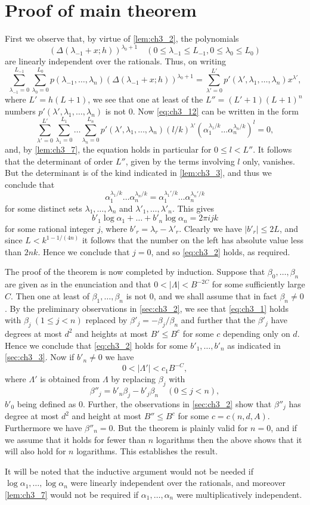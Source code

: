\section{Proof of main theorem}

First we observe that, by virtue of \autoref{lem:ch3_2}, the polynomials
\[
(\Delta(\lambda_{-1}+x; h))^{\lambda_0+1} \quad (0 \le \lambda_{-1} \le L_{-1}, 0 \le \lambda_0 \le L_0)
\]
are linearly independent over the rationals. Thus, on writing
\[
\sum_{\lambda_{-1}=0}^{L_{-1}} \sum_{\lambda_0=0}^{L_0} p(\lambda_{-1}, \dots, \lambda_n) (\Delta(\lambda_{-1}+x; h))^{\lambda_0+1} = \sum_{\lambda'=0}^{L'} p'(\lambda', \lambda_1, \dots, \lambda_n) x^{\lambda'},
\]
where $L' = h(L+1)$, we see that one at least of the $L'' = (L'+1)(L+1)^n$ numbers $p'(\lambda', \lambda_1, \dots, \lambda_n)$ is not $0$. Now \eqref{eq:ch3_12} can be written in the form
\[
\sum_{\lambda'=0}^{L'} \sum_{\lambda_1=0}^{L_1} \dots \sum_{\lambda_n=0}^{L_n} p'(\lambda', \lambda_1, \dots, \lambda_n) (l/k)^{\lambda'} (\alpha_1^{\lambda_1/k} \dots \alpha_n^{\lambda_n/k})^l = 0,
\]
and, by \autoref{lem:ch3_7}, the equation holds in particular for $0 \le l < L''$. It follows that the determinant of order $L''$, given by the terms involving $l$ only, vanishes. But the determinant is of the kind indicated in \autoref{lem:ch3_3}, and thus we conclude that
\[
\alpha_1^{\lambda_1/k} \dots \alpha_n^{\lambda_n/k} = \alpha_1^{\lambda_1'/k} \dots \alpha_n^{\lambda_n'/k}
\]
for some distinct sets $\lambda_1, \dots, \lambda_n$ and $\lambda'_1, \dots, \lambda'_n$. This gives
\[
b'_1 \log \alpha_1 + \dots + b'_n \log \alpha_n = 2\pi ijk
\]
for some rational integer $j$, where $b'_r = \lambda_r - \lambda'_r$. Clearly we have $|b'_r| \le 2L$, and since $L < k^{1-1/(4n)}$ it follows that the number on the left has absolute value less than $2nk$. Hence we conclude that $j = 0$, and so \eqref{eq:ch3_2} holds, as required.

The proof of the theorem is now completed by induction. Suppose that $\beta_0, \dots, \beta_n$ are given as in the enunciation and that $0 < |\Lambda| < B^{-2C}$ for some sufficiently large $C$. Then one at least of $\beta_1, \dots, \beta_n$ is not $0$, and we shall assume that in fact $\beta_n \neq 0$. By the preliminary observations in \autoref{sec:ch3_2}, we see that \eqref{eq:ch3_1} holds with $\beta_j \ (1 \le j < n)$ replaced by $\beta'_j = -\beta_j/\beta_n$ and further that the $\beta'_j$ have degrees at most $d^2$ and heights at most $B' \le B^c$ for some $c$ depending only on $d$. Hence we conclude that \eqref{eq:ch3_2} holds for some $b'_1, \dots, b'_n$ as indicated in \autoref{sec:ch3_3}. Now if $b'_n \neq 0$ we have
\[
0 < |\Lambda'| < c_1 B^{-C},
\]
where $\Lambda'$ is obtained from $\Lambda$ by replacing $\beta_j$ with
\[
\beta''_j = b'_n \beta_j - b'_j \beta_n \quad (0 \le j < n),
\]
$b'_0$ being defined as $0$. Further, the observations in \autoref{sec:ch3_2} show that $\beta''_j$ has degree at most $d^2$ and height at most $B'' \le B^c$ for some $c = c(n, d, A)$. Furthermore we have $\beta''_n = 0$. But the theorem is plainly valid for $n = 0$, and if we assume that it holds for fewer than $n$ logarithms then the above shows that it will also hold for $n$ logarithms. This establishes the result.

It will be noted that the inductive argument would not be needed if $\log \alpha_1, \dots, \log \alpha_n$ were linearly independent over the rationals, and moreover \autoref{lem:ch3_7} would not be required if $\alpha_1, \dots, \alpha_n$ were multiplicatively independent.